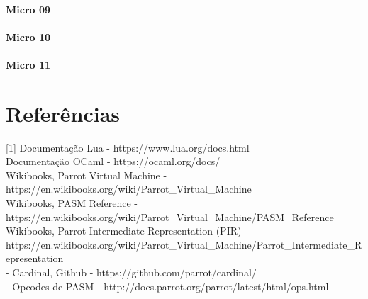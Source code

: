 \documentclass[12pt,a4paper,twoside]{report}
\begin{document}
\subsubsection{Micro 09}


\subsubsection{Micro 10}


\subsubsection{Micro 11}




\chapter{Referências}
[1] Documentação Lua - https://www.lua.org/docs.html \\
[2] Documentação OCaml - https://ocaml.org/docs/ \\
[3] Wikibooks, Parrot Virtual Machine - https://en.wikibooks.org/wiki/Parrot_Virtual_Machine \\
[4] Wikibooks, PASM Reference -
https://en.wikibooks.org/wiki/Parrot_Virtual_Machine/PASM_Reference \\
[5] Wikibooks, Parrot Intermediate Representation (PIR) -
https://en.wikibooks.org/wiki/Parrot_Virtual_Machine/Parrot_Intermediate_Representation
\\
[6] - Cardinal, Github - https://github.com/parrot/cardinal/ \\
[7] - Opcodes de PASM - http://docs.parrot.org/parrot/latest/html/ops.html \\

\clearpage
{}
\appendix
\end{document}
